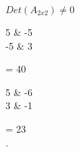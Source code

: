 \begin{frame}
	\begin{solution}

    $Det(A_{2x2}) \neq 0$ \\
    
    \begin{vmatrix}
		5     & -5 \\
		-5    &  3
	\end{vmatrix}= 40 \\

    \begin{vmatrix}
		5     & -6 \\
		3     & -1 
	\end{vmatrix}= 23 \\



    
		.
	\end{solution}
\end{frame}